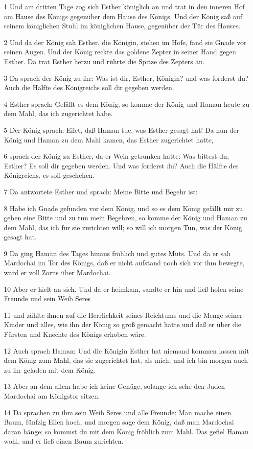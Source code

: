 \par 1 Und am dritten Tage zog sich Esther königlich an und trat in den inneren Hof am Hause des Königs gegenüber dem Hause des Königs. Und der König saß auf seinem königlichen Stuhl im königlichen Hause, gegenüber der Tür des Hauses.
\par 2 Und da der König sah Esther, die Königin, stehen im Hofe, fand sie Gnade vor seinen Augen. Und der König reckte das goldene Zepter in seiner Hand gegen Esther. Da trat Esther herzu und rührte die Spitze des Zepters an.
\par 3 Da sprach der König zu ihr: Was ist dir, Esther, Königin? und was forderst du? Auch die Hälfte des Königreichs soll dir gegeben werden.
\par 4 Esther sprach: Gefällt es dem König, so komme der König und Haman heute zu dem Mahl, das ich zugerichtet habe.
\par 5 Der König sprach: Eilet, daß Haman tue, was Esther gesagt hat! Da nun der König und Haman zu dem Mahl kamen, das Esther zugerichtet hatte,
\par 6 sprach der König zu Esther, da er Wein getrunken hatte: Was bittest du, Esther? Es soll dir gegeben werden. Und was forderst du? Auch die Hälfte des Königreichs, es soll geschehen.
\par 7 Da antwortete Esther und sprach: Meine Bitte und Begehr ist:
\par 8 Habe ich Gnade gefunden vor dem König, und so es dem König gefällt mir zu geben eine Bitte und zu tun mein Begehren, so komme der König und Haman zu dem Mahl, das ich für sie zurichten will; so will ich morgen Tun, was der König gesagt hat.
\par 9 Da ging Haman des Tages hinaus fröhlich und gutes Muts. Und da er sah Mardochai im Tor des Königs, daß er nicht aufstand noch sich vor ihm bewegte, ward er voll Zorns über Mardochai.
\par 10 Aber er hielt an sich. Und da er heimkam, sandte er hin und ließ holen seine Freunde und sein Weib Seres
\par 11 und zählte ihnen auf die Herrlichkeit seines Reichtums und die Menge seiner Kinder und alles, wie ihn der König so groß gemacht hätte und daß er über die Fürsten und Knechte des Königs erhoben wäre.
\par 12 Auch sprach Haman: Und die Königin Esther hat niemand kommen lassen mit dem König zum Mahl, das sie zugerichtet hat, als mich; und ich bin morgen auch zu ihr geladen mit dem König.
\par 13 Aber an dem allem habe ich keine Genüge, solange ich sehe den Juden Mardochai am Königstor sitzen.
\par 14 Da sprachen zu ihm sein Weib Seres und alle Freunde: Man mache einen Baum, fünfzig Ellen hoch, und morgen sage dem König, daß man Mardochai daran hänge; so kommst du mit dem König fröhlich zum Mahl. Das gefiel Haman wohl, und er ließ einen Baum zurichten.

